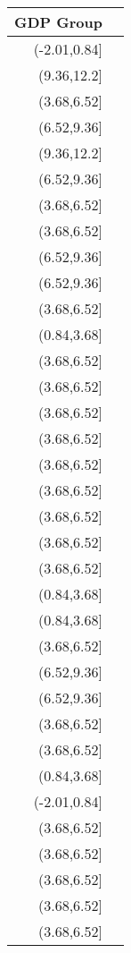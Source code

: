 \documentclass[11pt]{article}
\begin{document}
    \begin{tabular}{r|l}
 GDP Group\\
\hline
	 (-2.01,0.84{]}\\
	 (9.36,12.2{]} \\
	 (3.68,6.52{]} \\
	 (6.52,9.36{]} \\
	 (9.36,12.2{]} \\
	 (6.52,9.36{]} \\
	 (3.68,6.52{]} \\
	 (3.68,6.52{]} \\
	 (6.52,9.36{]} \\
	 (6.52,9.36{]} \\
	 (3.68,6.52{]} \\
	 (0.84,3.68{]} \\
	 (3.68,6.52{]} \\
	 (3.68,6.52{]} \\
	 (3.68,6.52{]} \\
	 (3.68,6.52{]} \\
	 (3.68,6.52{]} \\
	 (3.68,6.52{]} \\
	 (3.68,6.52{]} \\
	 (3.68,6.52{]} \\
	 (3.68,6.52{]} \\
	 (0.84,3.68{]} \\
	 (0.84,3.68{]} \\
	 (3.68,6.52{]} \\
	 (6.52,9.36{]} \\
	 (6.52,9.36{]} \\
	 (3.68,6.52{]} \\
	 (3.68,6.52{]} \\
	 (0.84,3.68{]} \\
	 (-2.01,0.84{]}\\
	 (3.68,6.52{]} \\
	 (3.68,6.52{]} \\
	 (3.68,6.52{]} \\
	 (3.68,6.52{]} \\
	 (3.68,6.52{]} \\
\end{tabular}
\end{document}
